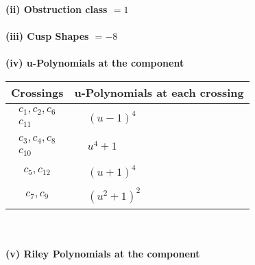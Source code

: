\documentclass[1p]{elsarticle_modified}
\theoremstyle{definition}
\begin{document}
\flushleft \textbf{(ii) Obstruction class $= 1$}\\~\\
\flushleft \textbf{(iii) Cusp Shapes $= -8$}\\~\\
\newpage\renewcommand{\arraystretch}{1}
\flushleft \textbf{(iv) u-Polynomials at the component}\newline \\
\begin{tabular}{m{50pt}|m{274pt}}
Crossings & \hspace{64pt}u-Polynomials at each crossing \\
\hline $$\begin{aligned}c_{1},c_{2},c_{6}\\c_{11}\end{aligned}$$&$\begin{aligned}
&(u-1)^4
\end{aligned}$\\
\hline $$\begin{aligned}c_{3},c_{4},c_{8}\\c_{10}\end{aligned}$$&$\begin{aligned}
&u^4+1
\end{aligned}$\\
\hline $$\begin{aligned}c_{5},c_{12}\end{aligned}$$&$\begin{aligned}
&(u+1)^4
\end{aligned}$\\
\hline $$\begin{aligned}c_{7},c_{9}\end{aligned}$$&$\begin{aligned}
&(u^2+1)^2
\end{aligned}$\\
\hline
\end{tabular}\\~\\
\newpage\renewcommand{\arraystretch}{1}
\flushleft \textbf{(v) Riley Polynomials at the component}\newline \\
\end{document}
